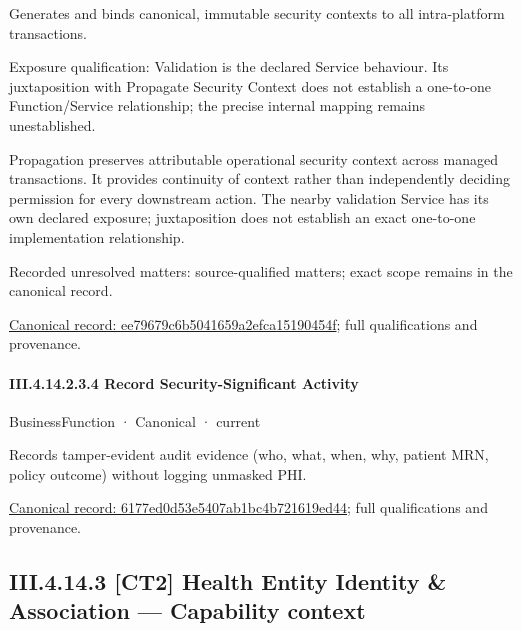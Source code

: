 Generates and binds canonical, immutable security contexts to all intra-platform transactions.



Exposure qualification: Validation is the declared Service behaviour. Its juxtaposition with Propagate Security Context does not establish a one-to-one Function/Service relationship; the precise internal mapping remains unestablished.



Propagation preserves attributable operational security context across managed transactions. It provides continuity of context rather than independently deciding permission for every downstream action. The nearby validation Service has its own declared exposure; juxtaposition does not establish an exact one-to-one implementation relationship.


{\small Recorded unresolved matters: source-qualified matters; exact scope remains in the canonical record.}\par
{\footnotesize \href{../../../../../../../continuum/business/business-function/ee79679c6b5041659a2efca15190454f.md}{Canonical record: ee79679c6b5041659a2efca15190454f}; full qualifications and provenance.}\par
\paragraph*{III.4.14.2.3.4 Record Security-Significant Activity}
\label{navigation:III.4.14.2.3.4}

\label{element:6177ed0d53e5407ab1bc4b721619ed44}
{\small BusinessFunction · Canonical · current}\par

Records tamper-evident audit evidence (who, what, when, why, patient MRN, policy outcome) without logging unmasked PHI.


{\footnotesize \href{../../../../../../../continuum/business/business-function/6177ed0d53e5407ab1bc4b721619ed44.md}{Canonical record: 6177ed0d53e5407ab1bc4b721619ed44}; full qualifications and provenance.}\par
\subsection*{III.4.14.3 [CT2] Health Entity Identity \& Association — Capability context}
\label{navigation:III.4.14.3}

